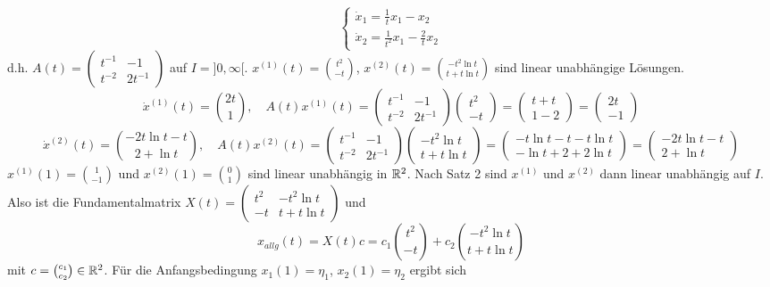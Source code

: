 \begin{beispiel}
	\[ \begin{cases}
	\dot x_1=\frac{1}{t}x_1-x_2\\
	\dot x_2=\frac{1}{t^2}x_1-\frac{2}{t}x_2
	\end{cases} \]
	d.h. $ A(t)=\begin{pmatrix}
	t^{-1}&-1\\t^{-2}&2t^{-1}
	\end{pmatrix} $ auf $ I=]0,\infty[ $. $ x^{(1)}(t)=\binom{t^2}{-t} $, $ x^{(2)}(t)=\binom{-t^2\ln t}{t+t\ln t} $ sind linear unabh\"angige L\"osungen.
	\[ \dot x^{(1)}(t)=\binom{2t}{1},\quad A(t)x^{(1)}(t)=\begin{pmatrix}
	t^{-1}&-1\\t^{-2}&2t^{-1}\end{pmatrix}\begin{pmatrix}
	t^2\\-t
	\end{pmatrix}= \begin{pmatrix}
	t+t\\1-2
	\end{pmatrix}= \begin{pmatrix}
	2t\\-1
	\end{pmatrix} \]
	\[ \dot x^{(2)}(t)=\binom{-2t\ln t-t}{2+\ln t},\quad A(t)x^{(2)}(t)=\begin{pmatrix}
	t^{-1}&-1\\t^{-2}&2t^{-1}\end{pmatrix}\begin{pmatrix}		-t^2\ln t\\t+t\ln t
	\end{pmatrix}= \begin{pmatrix}		
	-t\ln t-t-t\ln t\\-\ln t+2+2\ln t
	\end{pmatrix}= \begin{pmatrix}
	-2t\ln t-t\\2+\ln t
	\end{pmatrix} \]
	$ x^{(1)}(1)=\binom{1}{-1} $ und $ x^{(2)}(1)=\binom{0}{1} $ sind linear unabh\"angig in $ \mathbb{R}^2 $. Nach Satz 2 sind $ x^{(1)} $ und $ x^{(2)} $ dann linear unabh\"angig auf $ I $. Also ist die Fundamentalmatrix $ X(t)= \begin{pmatrix}
	t^2&-t^2\ln t\\-t&t+t\ln t
	\end{pmatrix} $ und
	\[ x_{allg}(t)=X(t)c=c_1\binom{t^2}{-t}+c_2\binom{-t^2\ln t}{t+t\ln t} \]
	mit $ c=\binom{c_1}{c_2}\in\mathbb{R}^2 $. F\"ur die Anfangsbedingung $ x_1(1)=\eta_1 $, $ x_2(1)=\eta_2 $ ergibt sich

\end{beispiel}
